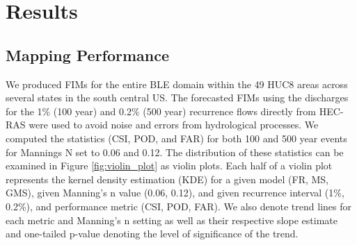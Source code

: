 \section{Results}
\label{sec:results}
%
\subsection{Mapping Performance}
\label{ssec:mapping_performance}
%
We produced FIMs for the entire BLE domain within the 49 HUC8 areas across several states in the south central US. 
The forecasted FIMs using the discharges for the 1\% (100 year) and 0.2\% (500 year) recurrence flows directly from HEC-RAS were used to avoid noise and errors from hydrological processes.
We computed the statistics (CSI, POD, and FAR) for both 100 and 500 year events for Mannings N set to 0.06 and 0.12. 
The distribution of these statistics can be examined in Figure \ref{fig:violin_plot} as violin plots.
Each half of a violin plot represents the kernel density estimation (KDE) for a given model (FR, MS, GMS), given Manning's n value (0.06, 0.12), and given recurrence interval (1\%, 0.2\%), and performance metric (CSI, POD, FAR).
We also denote trend lines for each metric and Manning's n setting as well as their respective slope estimate and one-tailed p-value denoting the level of significance of the trend.

